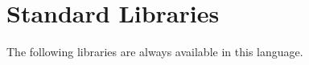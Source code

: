 









\newpage



















\section{Standard Libraries}

The following libraries are always available in this language.







    
